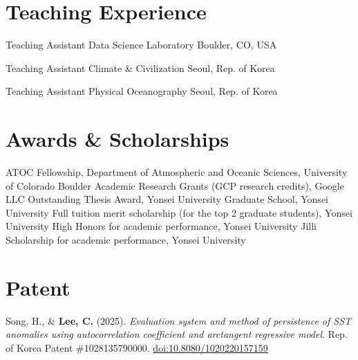 \documentclass[11pt,usletter,sans]{moderncv}
\newcommand{\doi}[1]{\href{https://doi.org/#1}{doi:#1}}
\begin{document}

\section{Teaching Experience}
        {Teaching Assistant}
        {Data Science Laboratory} %
        {Boulder, CO, USA}
        {}
        {}
        
\vspace{0.5em}

        {Teaching Assistant}
        {Climate \& Civilization}%
        {Seoul, Rep. of Korea}
        {}
        {}
        
\vspace{0.5em}

        {Teaching Assistant}
        {Physical Oceanography}%
        {Seoul, Rep. of Korea}
        {}
        {}


\section{Awards \& Scholarships}
       {ATOC Fellowship, Department of Atmospheric and Oceanic Sciences, University of Colorado Boulder}
       {Academic Research Grants (GCP research credits), Google LLC}
       {Outstanding Thesis Award, Yonsei University Graduate School, Yonsei University}
       {Full tuition merit scholarship (for the top 2 graduate students), Yonsei University}
       {High Honors for academic performance, Yonsei University}
       {Jilli Scholarship for academic performance, Yonsei University}

\section{Patent}
\cvitem{}
       {
       Song, H., \& \textbf{Lee, C.} (2025). \textit{Evaluation system and method of persistence of SST anomalies using autocorrelation coefficient and arctangent regressive model}. 
       Rep. of Korea Patent \#1028135790000.
       \doi{10.8080/1020220157159}
       }
\end{document}
